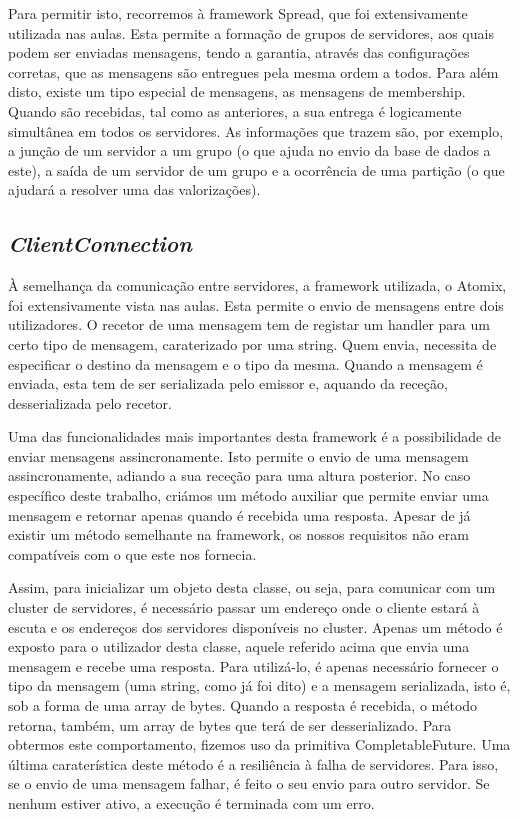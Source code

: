 \documentclass[a4paper]{report}
\begin{document}
{				Para permitir isto, recorremos à framework Spread, que foi extensivamente utilizada nas aulas. Esta permite a formação de grupos de servidores, aos quais podem ser enviadas mensagens, tendo a garantia, através das configurações corretas, que as mensagens são entregues pela mesma ordem a todos. Para além disto, existe um tipo especial de mensagens, as mensagens de membership. Quando são recebidas, tal como as anteriores, a sua entrega é logicamente simultânea em todos os servidores. As informações que trazem são, por exemplo, a junção de um servidor a um grupo (o que ajuda no envio da base de dados a este), a saída de um servidor de um grupo e a ocorrência de uma partição (o que ajudará a resolver uma das valorizações).

		\subsection{\textit{ClientConnection}} \label{subsec:ClientConnection}
			À semelhança da comunicação entre servidores, a framework utilizada, o Atomix, foi extensivamente vista nas aulas. Esta permite o envio de mensagens entre dois utilizadores. O recetor de uma mensagem tem de registar um handler para um certo tipo de mensagem, caraterizado por uma string. Quem envia, necessita de especificar o destino da mensagem e o tipo da mesma. Quando a mensagem é enviada, esta tem de ser serializada pelo emissor e, aquando da receção, desserializada pelo recetor.
			
			Uma das funcionalidades mais importantes desta framework é a possibilidade de enviar mensagens assincronamente. Isto permite o envio de uma mensagem assincronamente, adiando a sua receção para uma altura posterior. No caso específico deste trabalho, criámos um método auxiliar que permite enviar uma mensagem e retornar apenas quando é recebida uma resposta. Apesar de já existir um método semelhante na framework, os nossos requisitos não eram compatíveis com o que este nos fornecia.
			
			Assim, para inicializar um objeto desta classe, ou seja, para comunicar com um cluster de servidores, é necessário passar um endereço onde o cliente estará à escuta e os endereços dos servidores disponíveis no cluster. Apenas um método é exposto para o utilizador desta classe, aquele referido acima que envia uma mensagem e recebe uma resposta. Para utilizá-lo, é apenas necessário fornecer o tipo da mensagem (uma string, como já foi dito) e a mensagem serializada, isto é, sob a forma de uma array de bytes. Quando a resposta é recebida, o método retorna, também, um array de bytes que terá de ser desserializado. Para obtermos este comportamento, fizemos uso da primitiva CompletableFuture. Uma última caraterística deste método é a resiliência à falha de servidores. Para isso, se o envio de uma mensagem falhar, é feito o seu envio para outro servidor. Se nenhum estiver ativo, a execução é terminada com um erro.
	
}
\end{document}
